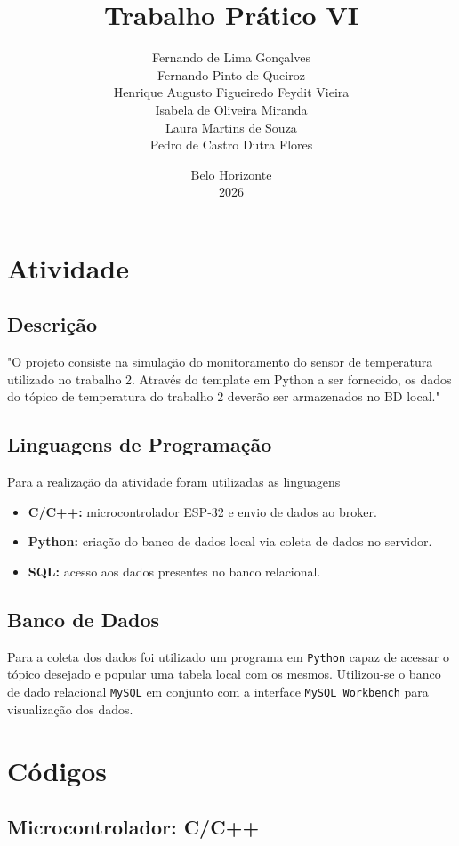 \documentclass[12pt,a4paper,titlepage]{article}
\title{Trabalho Prático VI}
\author{
    Fernando de Lima Gonçalves
    \\Fernando Pinto de Queiroz
    \\Henrique Augusto Figueiredo Feydit Vieira
    \\Isabela de Oliveira Miranda
    \\Laura Martins de Souza
    \\Pedro de Castro Dutra Flores
}
\date{Belo Horizonte\\2026}
\begin{document}
\maketitle
\tableofcontents

\clearpage\section{Atividade}
\subsection{Descrição}
"O projeto consiste na simulação do monitoramento do sensor de temperatura utilizado no
trabalho 2. Através do template em Python a ser fornecido, os dados do tópico de temperatura
do trabalho 2 deverão ser armazenados no BD local."

\subsection{Linguagens de Programação}
Para a realização da atividade foram utilizadas as linguagens

\begin{itemize}
    \item \textbf{C/C++:} microcontrolador ESP-32 e envio de dados ao broker.
    \item \textbf{Python:} criação do banco de dados local via coleta de dados no servidor.
    \item \textbf{SQL:} acesso aos dados presentes no banco relacional.
\end{itemize}

\subsection{Banco de Dados}
Para a coleta dos dados foi utilizado um programa em \texttt{Python} capaz de acessar o tópico desejado e popular uma tabela local com os mesmos.
Utilizou-se o banco de dado relacional \texttt{MySQL} em conjunto com a interface \texttt{MySQL Workbench} para visualização dos dados.

\section{Códigos}
\subsection{Microcontrolador: C/C++}
\inputminted{arduino}{../main/main.ino}
\end{document}
